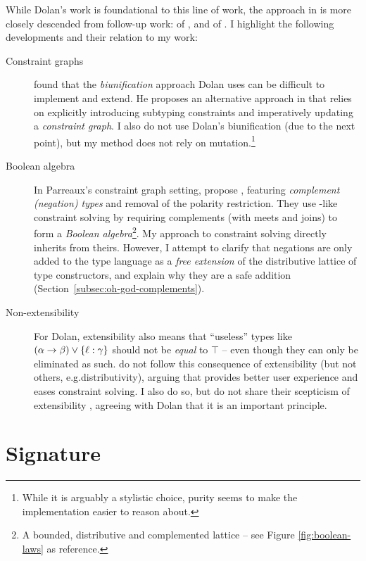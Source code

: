 While Dolan's work is foundational to this line of work, the approach in \inference{} is more closely descended from follow-up work: \simplesub{} of \textcite{simple-sub}, and \mlstruct{} of \textcite{mlstruct}. I highlight the following developments and their relation to my work: \begin{description}
    \item[Constraint graphs] \textcite{simple-sub} found that the \emph{biunification} approach Dolan uses can be difficult to implement and extend. He proposes an alternative approach in \simplesub{} that relies on explicitly introducing subtyping constraints and imperatively updating a \emph{constraint graph}. I also do not use Dolan's biunification (due to the next point), but my method does not rely on mutation.\footnote{While it is arguably a stylistic choice, purity seems to make the implementation easier to reason about.}
    \item[Boolean algebra] In Parreaux's constraint graph setting, \textcite{mlstruct} propose \mlstruct{}, featuring \emph{complement (negation) types} and removal of the polarity restriction. They use \simplesub{}-like constraint solving by requiring complements (with meets and joins) to form a \emph{Boolean algebra}\footnote{A bounded, distributive and complemented lattice -- see Figure \ref{fig:boolean-laws} as reference.}. My approach to constraint solving directly inherits from theirs. However, I attempt to clarify that negations are only added to the type language as a \emph{free extension} of the distributive lattice of type constructors, and explain why they are a safe addition (Section~\ref{subsec:oh-god-complements}).
    \item[Non-extensibility] For Dolan, extensibility also means that \enquote{useless} types like $(\alpha \to \beta) \join \flrec{\ell : \gamma}$ should not be \emph{equal} to $\top$ \cite[Section~1.4.1]{dolan-thesis} -- even though they can only be eliminated as such. \textcite{mlstruct} do not follow this consequence of extensibility (but not others, e.g.\@ distributivity), arguing that provides better user experience and eases constraint solving. I also do so, but do not share their scepticism of extensibility \cite{simple-sub}, agreeing with Dolan that it is an important principle. 
\end{description}

\section{Signature}
\label{sec:signature}

